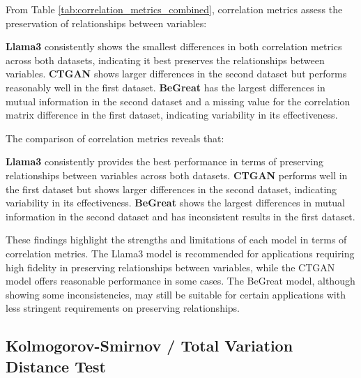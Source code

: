 From Table \ref{tab:correlation_metrics_combined}, correlation metrics assess the preservation of relationships between variables:

\textbf{Llama3} consistently shows the smallest differences in both correlation metrics across both datasets, indicating it best preserves the relationships between variables.
\textbf{CTGAN} shows larger differences in the second dataset but performs reasonably well in the first dataset.
\textbf{BeGreat} has the largest differences in mutual information in the second dataset and a missing value for the correlation matrix difference in the first dataset, indicating variability in its effectiveness.

\vspace{0.5cm}

The comparison of correlation metrics reveals that:

\textbf{Llama3} consistently provides the best performance in terms of preserving relationships between variables across both datasets.
\textbf{CTGAN} performs well in the first dataset but shows larger differences in the second dataset, indicating variability in its effectiveness.
\textbf{BeGreat} shows the largest differences in mutual information in the second dataset and has inconsistent results in the first dataset.

\vspace{0.5cm}

These findings highlight the strengths and limitations of each model in terms of correlation metrics. The Llama3 model is recommended for applications requiring high fidelity in preserving relationships between variables, while the CTGAN model offers reasonable performance in some cases. The BeGreat model, although showing some inconsistencies, may still be suitable for certain applications with less stringent requirements on preserving relationships.








\subsection{Kolmogorov-Smirnov / Total Variation Distance Test}



